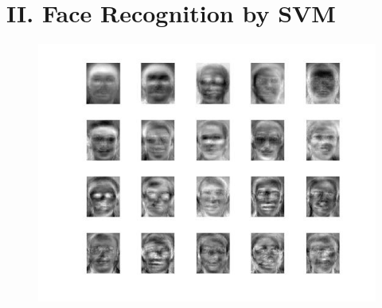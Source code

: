\documentclass[twoside,a4paper]{article}
\begin{document}
\section*{II. Face Recognition by SVM}
\begin{figure}[H]
\centering
\includegraphics[width=7in]{face.jpg}
\end{figure}
\end{document}
